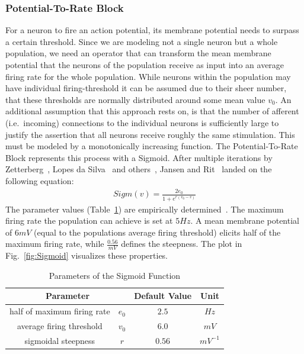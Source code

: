 \subsubsection{Potential-To-Rate Block}
For a neuron to fire an action potential, its membrane potential needs to surpass a certain threshold.
Since we are modeling not a single neuron but a whole population, we need an operator that can transform
the mean membrane potential that the neurons of the population receive as input into an average firing rate
for the whole population.
While neurons within the population may have individual firing-threshold%
it can be assumed due to their sheer number,
that these thresholds are normally distributed around some mean value $v_0$. %
An additional assumption that this approach rests on,
is that the number of afferent (i.e.\ incoming) connections to the individual neurons is sufficiently
large to justify the assertion that all neurons receive roughly the same stimulation.
This must be modeled by a monotonically increasing function.
The Potential-To-Rate Block represents this process with a Sigmoid.
After multiple iterations by Zetterberg~\cite{zetterberg_performance_1978},
Lopes da Silva~\cite{lopes_da_silva_models_1976} and others~\cite{van_rotterdam_model_1982},
Jansen and Rit~\cite{jansen_neurophysiologically-based_1993,
    jansen_electroencephalogram_1995} landed on the following equation:
\begin{align}
    Sigm(v) = \frac{2e_0}{1+e^{r(v_0-v)}} \label{eq:SigmJansenRit}
\end{align}
The parameter values (Table~\ref{tab:sigmoid_params}) are empirically
determined~\parencite{jansen_neurophysiologically-based_1993}.
The maximum firing rate the population can achieve is set at $5 Hz$.
A mean membrane potential of $6 mV$ (equal to the populations average firing threshold) elicits half
of the maximum firing rate, while $\frac{0.56}{mV}$ defines the steepness.
The plot in Fig.~\ref{fig:Sigmoid} visualizes these properties.
\begin{table}[H]
    \centering
    \begin{tabular}{ |c|c|c|c| }
        \hline
        \multicolumn{2}{|c|}{Parameter} & Default Value & Unit \\
        \hline
        \hline
        half of maximum firing rate & \(e_0\) & \(2.5\)  & \(Hz\)      \\
        \hline
        average firing threshold    & \(v_0\) & \(6.0\)  & \(mV\)      \\
        \hline
        sigmoidal steepness         & \(r\)   & \(0.56\) & \(mV^{-1}\) \\
        \hline
    \end{tabular}
    \caption{Parameters of the Sigmoid Function}
    \label{tab:sigmoid_params}
\end{table}


